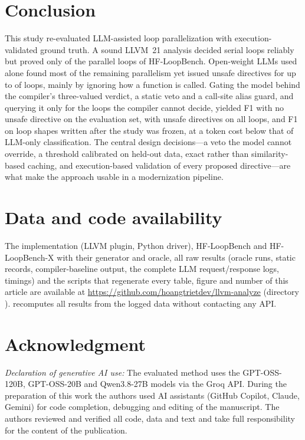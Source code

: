 \section{Conclusion}
\label{sec:conclusion}
This study re-evaluated LLM-assisted loop parallelization with execution-validated ground truth. A sound LLVM~21 analysis decided serial loops reliably but proved only \fsStaticRec{} of the parallel loops of HF-LoopBench. Open-weight LLMs used alone found most of the remaining parallelism yet issued unsafe directives for up to \evAITwentyFP{} of \nEvalLoops{} loops, mainly by ignoring how a function is called. Gating the model behind the compiler's three-valued verdict, a static veto and a call-site alias guard, and querying it only for the loops the compiler cannot decide, yielded F1 \evHCTwentyFone{} with no unsafe directive on the evaluation set, \fhTwentyFone{} with \fhTwentyFP{} unsafe directives on all \nBenchLoops{} loops, and F1 \xHTwentyFone{} on loop shapes written after the study was frozen, at a token cost \projSaveTwenty{} below that of LLM-only classification. The central design decisions---a veto the model cannot override, a threshold calibrated on held-out data, exact rather than similarity-based caching, and execution-based validation of every proposed directive---are what make the approach usable in a modernization pipeline.

\section*{Data and code availability}
\label{sec:artifact}
The implementation (LLVM plugin, Python driver), HF-LoopBench and HF-LoopBench-X with their generator and oracle, all raw results (oracle runs, static records, compiler-baseline output, the complete LLM request/response logs, timings) and the scripts that regenerate every table, figure and number of this article are available at \url{https://github.com/hoangtrietdev/llvm-analyze} (directory ).  recomputes all results from the logged data without contacting any API.

\section*{Acknowledgment}
\textit{Declaration of generative AI use:} The evaluated method uses the GPT-OSS-120B, GPT-OSS-20B and Qwen3.8-27B models via the Groq API. During the preparation of this work the authors used AI assistants (GitHub Copilot, Claude, Gemini) for code completion, debugging and editing of the manuscript. The authors reviewed and verified all code, data and text and take full responsibility for the content of the publication.
